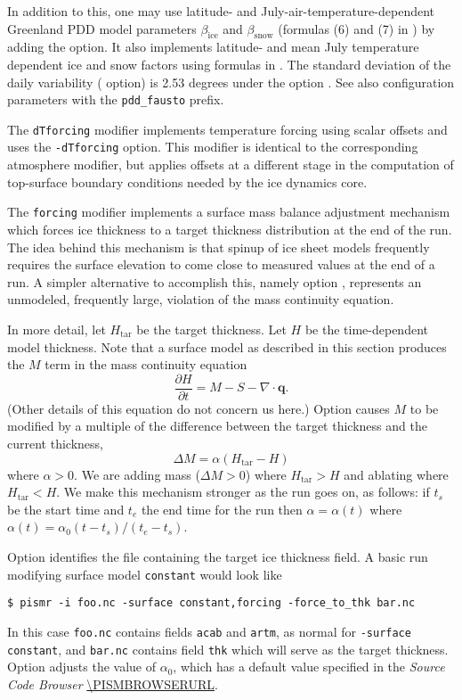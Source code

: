 \begin{itemize}
In addition to this, one may use latitude- and July-air-temperature-dependent Greenland PDD model parameters $\beta_{\mathrm{ice}}$ and $\beta_{\mathrm{snow}}$ (formulas (6) and (7) in \cite{Faustoetal2009}) by adding the   option.  It also implements latitude- and mean July temperature dependent ice and snow factors using formulas in \cite{Faustoetal2009}.  The standard deviation of the daily variability ( option) is 2.53 degrees under the  option \cite{Faustoetal2009}. See also configuration parameters with the \texttt{pdd_fausto} prefix.
\end{itemize}

The \texttt{dTforcing} modifier implements temperature forcing using scalar offsets and uses the \texttt{-dTforcing} option. This modifier is identical to the corresponding atmosphere modifier, but applies offsets at a different stage in the computation of top-surface boundary conditions needed by the ice dynamics core.

The \texttt{forcing} modifier implements a surface mass balance adjustment mechanism which forces ice thickness to a target thickness distribution at the end of the run.  The idea behind this mechanism is that spinup of ice sheet models frequently requires the surface elevation to come close to measured values at the end of a run.  A simpler alternative to accomplish this, namely option , represents an unmodeled, frequently large, violation of the mass continuity equation.

In more detail, let $H_{\text{tar}}$ be the target thickness.  Let $H$ be the time-dependent model thickness.  Note that a surface model as described in this section produces the $M$ term in the mass continuity equation
  $$\frac{\partial H}{\partial t} = M - S - \nabla\cdot \mathbf{q}.$$
(Other details of this equation do not concern us here.)  Option  causes $M$ to be modified by a multiple of the difference between the target thickness and the current thickness,
  $$\Delta M = \alpha (H_{\text{tar}} - H)$$
where $\alpha>0$.  We are adding mass ($\Delta M>0$) where $H_{\text{tar}} > H$ and ablating where $H_{\text{tar}} < H$.  We make this mechanism stronger as the run goes on, as follows: if $t_s$ be the start time and $t_e$ the end time for the run then $\alpha=\alpha(t)$ where $\alpha(t) = \alpha_0 (t-t_s)/(t_e-t_s)$.

Option  identifies the file containing the target ice thickness field.  A basic run modifying surface model \texttt{constant} would look like
\begin{verbatim}
$ pismr -i foo.nc -surface constant,forcing -force_to_thk bar.nc
\end{verbatim}%
In this case \texttt{foo.nc} contains fields \texttt{acab} and \texttt{artm}, as normal for \texttt{-surface constant}, and \texttt{bar.nc} contains field \texttt{thk} which will serve as the target thickness.  Option  adjusts the value of $\alpha_0$, which has a default value specified in the \emph{Source Code Browser} \url{\PISMBROWSERURL}.

